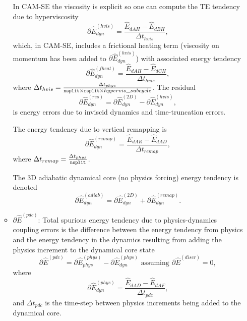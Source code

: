\documentclass{agujournal}
\newcommand*{\gi}[1]{\widehat{#1}}
\begin{document}
\begin{enumerate}
\begin{itemize}
In CAM-SE the viscosity is explicit so one can compute the TE tendency due to hyperviscosity
\begin{equation}
\partial \gi{E}_{dyn}^{({hvis})}=\frac{\gi{E}_{dAH}-\gi{E}_{dBH}}{\Delta t_{hvis}},
\end{equation}
which, in CAM-SE, includes a frictional heating term (viscosity on momentum has been added to $\partial \gi{E}^{({hvis})}_{dyn}$) with associated energy tendency
\begin{equation}
\partial \gi{E}_{dyn}^{({fheat})}=\frac{\gi{E}_{dAH}-\gi{E}_{dCH}}{\Delta t_{hvis}},
\end{equation}
where $\Delta t_{hvis}=\frac{\Delta t_{phys}}{{\tt{nsplit}}\times {\tt{rsplit}} \times hypervis\_subcycle}$. The residual
\begin{equation}
\partial \gi{E}_{dyn}^{(res)}=\partial \gi{E}_{dyn}^{({2D})}-\partial \gi{E}_{dyn}^{({hvis})},
\end{equation}
is energy errors due to inviscid dynamics and time-truncation errors.

The energy tendency due to vertical remapping is
\begin{equation}
\partial \gi{E}_{dyn}^{({remap})}=\frac{\gi{E}_{dAR}-\gi{E}_{dAD}}{\Delta t_{remap}},
\end{equation}
where $\Delta t_{remap}=\frac{\Delta t_{phys}}{{\tt{nsplit}}}$.

The 3D adiabatic dynamical core (no physics forcing) energy tendency is denoted
\begin{equation}
\partial \gi{E}_{dyn}^{({adiab})}=\partial \gi{E}_{dyn}^{({2D})}+\partial \gi{E}_{dyn}^{({remap})}.
\end{equation}
\item $\partial \gi{E}^{(pdc)}$: Total spurious energy tendency due to physics-dynamics coupling errors is the difference between the energy tendency from physics and the energy tendency in the dynamics resulting from adding the physics increment to the dynamical core state
\begin{equation}
\label{eq:pdc}
\partial \gi{E}^{(pdc)}=\partial \gi{E}_{phys}^{({phys})}-\partial \gi{E}_{dyn}^{({phys})} \text{ assuming }\partial \gi{E}^{({discr})}=0,
\end{equation}
where
\begin{equation}
\partial \gi{E}_{dyn}^{({phys})}=\frac{\gi{E}_{dAD}-\gi{E}_{dAF}}{\Delta t_{pdc}},
\end{equation}
and $\Delta t_{pdc}$ is the time-step between physics increments being added to the dynamical core. 


\end{itemize}
\end{enumerate}
\end{document}
